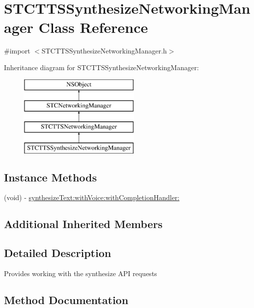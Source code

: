 \hypertarget{interface_s_t_c_t_t_s_synthesize_networking_manager}{}\section{S\+T\+C\+T\+T\+S\+Synthesize\+Networking\+Manager Class Reference}
\label{interface_s_t_c_t_t_s_synthesize_networking_manager}


{\ttfamily \#import $<$S\+T\+C\+T\+T\+S\+Synthesize\+Networking\+Manager.\+h$>$}

Inheritance diagram for S\+T\+C\+T\+T\+S\+Synthesize\+Networking\+Manager\+:\begin{figure}[H]
\begin{center}
\leavevmode
\includegraphics[height=4.000000cm]{interface_s_t_c_t_t_s_synthesize_networking_manager}
\end{center}
\end{figure}
\subsection*{Instance Methods}
\begin{DoxyCompactItemize}
\item 
(void) -\/ \hyperlink{interface_s_t_c_t_t_s_synthesize_networking_manager_aeac7d00b648ff16a07cbb5db3cd799e1}{synthesize\+Text\+:with\+Voice\+:with\+Completion\+Handler\+:}
\end{DoxyCompactItemize}
\subsection*{Additional Inherited Members}


\subsection{Detailed Description}
Provides working with the synthesize A\+PI requests 

\subsection{Method Documentation}
\hypertarget{interface_s_t_c_t_t_s_synthesize_networking_manager_aeac7d00b648ff16a07cbb5db3cd799e1}{}\label{interface_s_t_c_t_t_s_synthesize_networking_manager_aeac7d00b648ff16a07cbb5db3cd799e1} 
